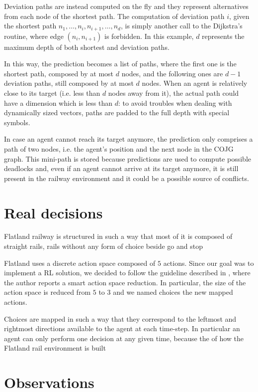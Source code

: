 \documentclass[a4paper,10pt]{report}
\begin{document}
Deviation paths are instead computed on the fly and they represent alternatives from each node of the shortest path. The computation of deviation path $i$, given the shortest path $n_1, \dots, n_i, n_{i+1}, \dots, n_d$, is simply another call to the Dijkstra's routine, where edge $(n_i, n_{i+1})$ is forbidden. In this example, $d$ represents the maximum depth of both shortest and deviation paths.

In this way, the prediction becomes a list of paths, where the first one is the shortest path, composed by at most $d$ nodes, and the following ones are $d-1$ deviation paths, still composed by at most $d$ nodes. When an agent is relatively close to its target (i.e. less than $d$ nodes away from it), the actual path could have a dimension which is less than $d$: to avoid troubles when dealing with dynamically sized vectors, paths are padded to the full depth with special symbols.

In case an agent cannot reach its target anymore, the prediction only comprises a path of two nodes, i.e. the agent's position and the next node in the COJG graph. This mini-path is stored because predictions are used to compute possible deadlocks and, even if an agent cannot arrive at its target anymore, it is still present in the railway environment and it could be a possible source of conflicts.

\section{Real decisions}\label{sec:real-decisions}
Flatland railway is structured in such a way that most of it is composed of straight rails, rails without any form of choice beside go and stop

Flatland uses a discrete action space composed of $5$ actions. Since our goal was to implement a RL solution, we decided to follow the guideline described in \cite{jonas}, where the author reports a smart action space reduction. In particular, the size of the action space is reduced from $5$ to $3$ and we named choices the new mapped actions.

Choices are mapped in such a way that they correspond to the leftmost and rightmost directions available to the agent at each time-step. In particular an agent can only perform one decision at any given time, because the of how the Flatland rail environment is built

\section{Observations}
\end{document}
